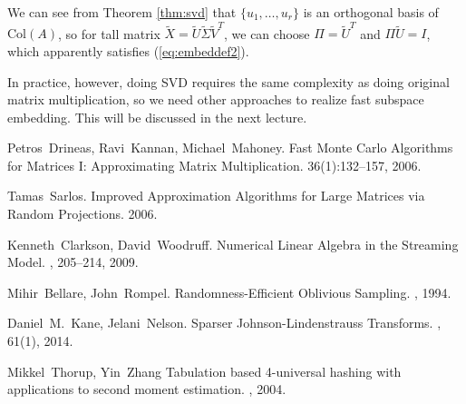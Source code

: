 \documentclass[11pt]{article}
\begin{document}
We can see from Theorem \ref{thm:svd} that $\{u_1,\ldots,u_r\}$ is an orthogonal basis of $\text{Col}(A)$, so for tall matrix $\widetilde{X}=\widetilde{U}\widetilde{\Sigma} \widetilde{V}^T$, we can choose $\Pi = \widetilde{U}^T$ and $\Pi \widetilde{U}=I$, which apparently satisfies (\ref{eq:embeddef2}).

In practice, however, doing SVD requires the same complexity as doing original matrix multiplication, so we need other approaches to realize fast subspace embedding. This will be discussed in the next lecture.



\begin{thebibliography}{42}

Petros~Drineas, Ravi~Kannan, Michael~Mahoney.
\newblock Fast Monte Carlo Algorithms for Matrices I: Approximating Matrix Multiplication.
 36(1):132--157, 2006.

Tamas~Sarlos.
\newblock Improved Approximation Algorithms for Large Matrices via Random Projections.
 2006.

Kenneth~Clarkson, David~Woodruff.
\newblock Numerical Linear Algebra in the Streaming Model.
, 205--214, 2009.

Mihir~Bellare, John~Rompel.
\newblock Randomness-Efficient Oblivious Sampling.
, 1994.

Daniel~M.~Kane, Jelani~Nelson.
\newblock Sparser Johnson-Lindenstrauss Transforms.
, 61(1), 2014.

Mikkel~Thorup, Yin~Zhang
\newblock Tabulation based 4-universal hashing with applications to second moment estimation.
, 2004.

\end{thebibliography}
\end{document}

